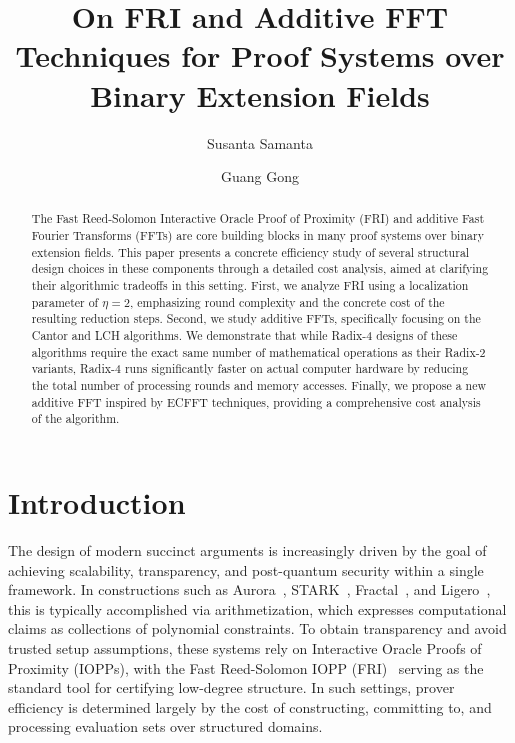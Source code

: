 \documentclass[11pt,runningheads]{llncs}
\title{On FRI and Additive FFT Techniques for Proof Systems over Binary Extension Fields}
\author{Susanta Samanta \and Guang Gong}
\institute{Department of Electrical and Computer Engineering, University of Waterloo,\\
Waterloo, Ontario, N2L 3G1, Canada \\ 
\email{\{ssamanta,ggong\}@uwaterloo.ca}
}
\date{}
\begin{document}
\maketitle



\begin{abstract}
    The Fast Reed-Solomon Interactive Oracle Proof of Proximity (FRI) and additive Fast Fourier Transforms (FFTs) are core building blocks in many proof systems over binary extension fields. This paper presents a concrete efficiency study of several structural design choices in these components through a detailed cost analysis, aimed at clarifying their algorithmic tradeoffs in this setting. First, we analyze FRI using a localization parameter of $\eta=2$, emphasizing round complexity and the concrete cost of the resulting reduction steps. Second, we study additive FFTs, specifically focusing on the Cantor and LCH algorithms. We demonstrate that while Radix-4 designs of these algorithms require the exact same number of mathematical operations as their Radix-2 variants, Radix-4 runs significantly faster on actual computer hardware by reducing the total number of processing rounds and memory accesses. Finally, we propose a new additive FFT inspired by ECFFT techniques, providing a comprehensive cost analysis of the algorithm.
\end{abstract}



\section{Introduction}
The design of modern succinct arguments is increasingly driven by the goal of achieving scalability, transparency, and post-quantum security within a single framework. In constructions such as Aurora~\cite{Aurora2019}, STARK~\cite{STARK2018}, Fractal~\cite{Chiesa2020Fractal}, and Ligero~\cite{Ames2017Ligero}, this is typically accomplished via arithmetization, which expresses computational claims as collections of polynomial constraints. To obtain transparency and avoid trusted setup assumptions, these systems rely on Interactive Oracle Proofs of Proximity (IOPPs), with the Fast Reed-Solomon IOPP (FRI)~\cite{FRI2018} serving as the standard tool for certifying low-degree structure. In such settings, prover efficiency is determined largely by the cost of constructing, committing to, and processing evaluation sets over structured domains.
\end{document}
